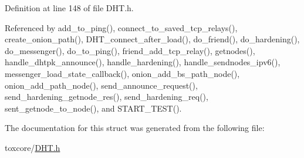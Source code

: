 Definition at line 148 of file D\+H\+T.\+h.



Referenced by add\+\_\+to\+\_\+ping(), connect\+\_\+to\+\_\+saved\+\_\+tcp\+\_\+relays(), create\+\_\+onion\+\_\+path(), D\+H\+T\+\_\+connect\+\_\+after\+\_\+load(), do\+\_\+friend(), do\+\_\+hardening(), do\+\_\+messenger(), do\+\_\+to\+\_\+ping(), friend\+\_\+add\+\_\+tcp\+\_\+relay(), getnodes(), handle\+\_\+dhtpk\+\_\+announce(), handle\+\_\+hardening(), handle\+\_\+sendnodes\+\_\+ipv6(), messenger\+\_\+load\+\_\+state\+\_\+callback(), onion\+\_\+add\+\_\+bs\+\_\+path\+\_\+node(), onion\+\_\+add\+\_\+path\+\_\+node(), send\+\_\+announce\+\_\+request(), send\+\_\+hardening\+\_\+getnode\+\_\+res(), send\+\_\+hardening\+\_\+req(), sent\+\_\+getnode\+\_\+to\+\_\+node(), and S\+T\+A\+R\+T\+\_\+\+T\+E\+S\+T().



The documentation for this struct was generated from the following file\+:\begin{DoxyCompactItemize}
\item 
toxcore/\hyperlink{_d_h_t_8h}{D\+H\+T.\+h}\end{DoxyCompactItemize}
